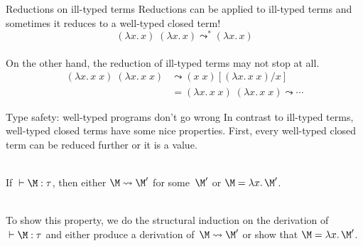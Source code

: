 \begin{frame}{Reductions on ill-typed terms}
  Reductions can be applied to ill-typed terms
  and sometimes it reduces to a well-typed closed term! 
  \[
        (\lambda x.\,x)\;(\lambda x.\,x)
        \leadsto^* (\lambda x.\, x)
  \]
  ~\\

  On the other hand, 
  the reduction of ill-typed terms may not stop at all.
  \begin{align*}
    (\lambda x.\, x\; x)\;(\lambda x.\, x\; x)
    & \leadsto (x\; x)[(\lambda x.\, x\; x)/ x] \\
    & = (\lambda x.\, x\; x)\;(\lambda x.\, x\; x) 
    \leadsto \cdots
  \end{align*}
\end{frame}

\begin{frame}{Type safety: well-typed programs don't go wrong}
  In contrast to ill-typed terms, well-typed closed terms have some nice
  properties.  First, every well-typed closed term can be reduced further or it
  is a
  \alert{value}.
  \\~\\
  \begin{theorem}
    If ${}\vdash \M:\tau$, then either $\M \leadsto \M'$ for some~$\M'$
    or $\M = \lambda x.\, \M'$. 
  \end{theorem}
  ~\\
  To show this property, we do the structural induction on the derivation
  of~${}\vdash \M : \tau$ and either produce a derivation of~$\M \leadsto \M'$
  or show that $\M = \lambda x.\, \M'$.
\end{frame}

